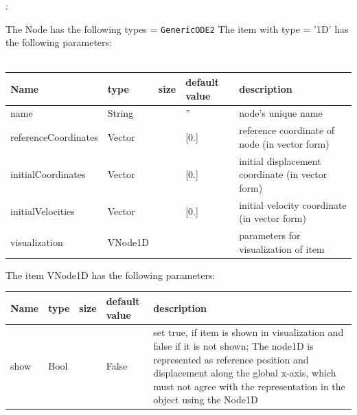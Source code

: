 \noindent {}:
\bi
  \item The Node has the following types = \texttt{GenericODE2}
\ei\vspace{12pt} \noindent 
The item  with type = '1D' has the following parameters:
\vspace{-0.5cm}\\
\vspace{-0.5cm}\\
\begin{center}
  \footnotesize
  \begin{longtable}{| p{4.5cm} | p{2.5cm} | p{0.5cm} | p{2.5cm} | p{6cm} |}
    \hline
    \bf Name & \bf type & \bf size & \bf default value & \bf description \\ \hline
    name &     String &      &     '' &     node's unique name\\ \hline
    referenceCoordinates &     Vector &      &     [0.] &     reference coordinate of node (in vector form)\\ \hline
    initialCoordinates &     Vector &      &     [0.] &     initial displacement coordinate (in vector form)\\ \hline
    initialVelocities &     Vector &      &     [0.] &     initial velocity coordinate (in vector form)\\ \hline
    visualization &     VNode1D &      &      &     parameters for visualization of item\\ \hline
\end{longtable}
\end{center}

\noindent The item VNode1D has the following parameters:
\begin{center}
  \footnotesize
  \begin{longtable}{| p{4.5cm} | p{2.5cm} | p{0.5cm} | p{2.5cm} | p{6cm} |}
    \hline
    \bf Name & \bf type & \bf size & \bf default value & \bf description \\ \hline
    show &     Bool &      &     False &     set true, if item is shown in visualization and false if it is not shown; The node1D is represented as reference position and displacement along the global x-axis, which must not agree with the representation in the object using the Node1D\\ \hline
\end{longtable}
\end{center}

